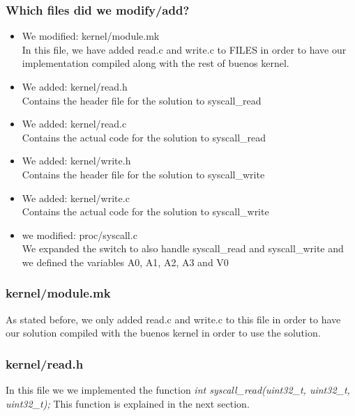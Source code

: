 \documentclass[a4paper,12pt,danish]{report}
\begin{document}
\subsubsection{Which files did we modify/add?}
\begin{itemize}
    \item{We modified: kernel/module.mk}
        \\
        In this file, we have added read.c and write.c to FILES in order to have our implementation compiled along
        with the rest of buenos kernel.
    \item{We added: kernel/read.h}
        \\
        Contains the header file for the solution to syscall\_read
    \item{We added: kernel/read.c}
        \\
        Contains the actual code for the solution to syscall\_read
    \item{We added: kernel/write.h}
        \\
        Contains the header file for the solution to syscall\_write
    \item{We added: kernel/write.c}
        \\
        Contains the actual code for the solution to syscall\_write
    \item{we modified: proc/syscall.c}
        \\
        We expanded the switch to also handle syscall\_read and syscall\_write and we defined the 
        variables A0, A1, A2, A3 and V0
\end{itemize}
\subsubsection{kernel/module.mk}
As stated before, we only added read.c and write.c to this file in order to have our solution compiled with the buenos kernel in order to use the solution.

\subsubsection{kernel/read.h}
In this file we we implemented the function \textit{int syscall\_read(uint32\_t, uint32\_t, uint32\_t);}
This function is explained in the next section.
\end{document}
